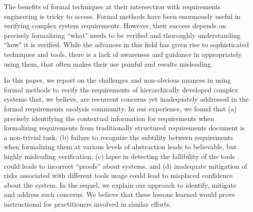 The benefits of formal techniques at their intersection with requirements engineering is tricky to access. Formal methods have been enormously useful in verifying complex system requirements. However, their success depends on precisely formalizing ``what" needs to be verified and thoroughly understanding ``how" it is verified. While the advances in this field has given rise to sophisticated techniques and tools, there is a lack of awareness and guidance in appropriately using them, that often makes their use painful and results misleading.

In this paper, we report on the challenges and non-obvious nuances in using formal methods to verify the requirements of hierarchically developed complex systems that, we believe, are recurrent concerns yet inadequately addressed  in the formal requirements analysis community. In our experience, we found that (a) precisely identifying the contextual information for requirements when formalizing requirements from traditionally structured requirements document is a non-trivial task, (b) failure to recognize the subtility between requirements when formalizing them at various levels of abstraction leads to believable, but highly misleading verification, (c) lapse in detecting the fallibility of the tools could leads to incorrect “proofs” about systems, and (d) inadequate mitigation of risks associated with different tools usage could lead to misplaced confidence about the system. In the sequel, we explain our approach to identify, mitigate and address such concerns. We believe that these lessons learned would prove instructional for practitioners involved in similar efforts.

%
%
%
%
%
%


